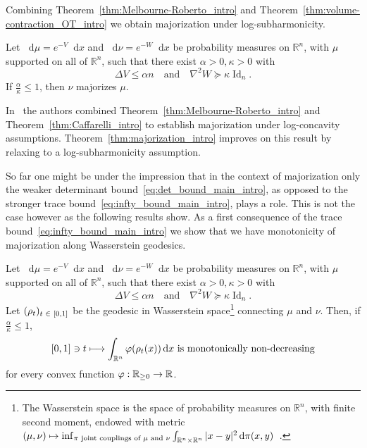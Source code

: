 \documentclass[AHL,Unicode,longabstracts]{cedram}
\newcommand{\R}{\mathbb R}
\DeclareMathOperator{\Id}{Id}
\newcommand{\V}{V}
\newcommand{\W}{W}
\newcommand{\dd}{n}
\newcommand{\prob}{\rho}
\newcommand{\source}{\mu}
\newcommand{\target}{\nu}
\newcommand{\lsh}{\alpha}
\newcommand{\lc}{\kappa}
\newcommand*\diff{\mathop{}\!\mathrm{d}}
\newcommand{\cxfun}{\varphi}
\renewcommand*{\to}{\mathchoice{\longrightarrow}{\rightarrow}{\rightarrow}{\rightarrow}}
\let\oldmapsto\mapsto
\renewcommand*{\mapsto}{\mathchoice{\longmapsto}{\oldmapsto}{\oldmapsto}{\oldmapsto}}
\let\oldin\in
\renewcommand{\in}{\mathchoice{\oldin}{\oldin}{\,\oldin\,}{\,\oldin\,}}
\begin{document}
Combining Theorem~\ref{thm:Melbourne-Roberto_intro} and Theorem~\ref{thm:volume-contraction_OT_intro} we obtain majorization under log-subharmonicity.

\begin{theo}[Majorization]\label{thm:majorization_intro}
Let $\diff\source=e^{-\V}\diff x$ and $\diff\target=e^{-\W}\diff x$ be probability measures on $\R^{\dd}$, with $\source$ supported on all of $\R^{\dd}$, such that there exist $\lsh>0,\lc>0$ with
\[
\Delta \V \le \lsh\dd \quad\text{and}\quad \nabla^2\W \succeq \lc \Id_{\dd}.
\]
If $\frac{\lsh}{\lc}\le 1$, then $\target$ majorizes $\source$.
\end{theo}

In~\cite{MR2023} the authors combined Theorem~\ref{thm:Melbourne-Roberto_intro} and Theorem~\ref{thm:Caffarelli_intro} to establish majorization under log-concavity assumptions. Theorem~\ref{thm:majorization_intro} improves on this result by relaxing to a log-subharmonicity assumption.

So far one might be under the impression that in the context of majorization only the weaker determinant bound~\eqref{eq:det_bound_main_intro}, as opposed to the stronger trace bound~\eqref{eq:infty_bound_main_intro}, plays a role. This is not the case however as the following results show. As a first consequence of the trace bound~\eqref{eq:infty_bound_main_intro} we show that we have monotonicity of majorization along Wasserstein geodesics.


\begin{theo}\label{thm:mono_intro}
Let $\diff\source=e^{-\V}\diff x$ and $\diff\target=e^{-\W}\diff x$ be probability measures on $\R^{\dd}$, with $\source$ supported on all of $\R^{\dd}$, such that there exist $\lsh>0,\lc>0$ with
\[
\Delta \V \le \lsh\dd \quad\text{and}\quad \nabla^2\W \succeq \lc \Id_{\dd}.
\]
Let $(\prob_t)_{t\in [0,1]}$ be the geodesic in Wasserstein space\footnote{The Wasserstein space is the space of probability measures on $\R^{\dd}$, with finite second moment, endowed with metric $(\source,\target)\mapsto \inf_{\text{$\pi$ joint couplings of $\source$ and $\target$} } \int_{\R^{\dd}\times\R^{\dd}}|x-y|^2\diff\pi(x,y)$~\cite{villani2021topics}.} connecting $\source$ and $\target$. Then, if $\frac{\lsh}{\lc}\le 1$,
\begin{equation}\label{eq:mono_geo}
[0,1]\ni t\mapsto \int_{\R^{\dd}}\cxfun(\prob_t(x))\diff x\textnormal{ is monotonically non-decreasing}
\end{equation}
for every convex function $\cxfun:\R_{\ge 0}\to \R$.
\end{theo}
\end{document}
